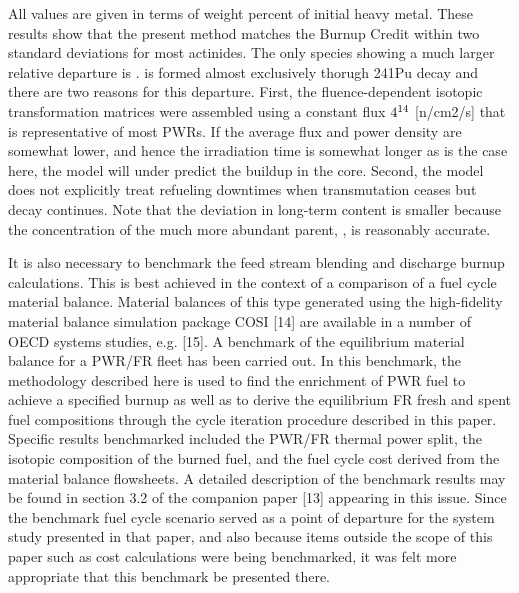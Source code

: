 All values are given in terms of weight percent of initial heavy metal.    These results show that 
the present method matches the Burnup Credit within two standard deviations for most actinides.  
The only species showing a much larger relative departure is .   is formed 
almost exclusively thorugh 241Pu decay and there are two reasons for this departure.  First, the 
fluence-dependent isotopic transformation matrices were assembled using a constant flux $4\time10^{14}$ 
[n/cm2/s] that is representative of most PWRs.  If the average flux and power density are somewhat lower, 
and hence the irradiation time is somewhat longer as is the case here, the model will under predict the 
 buildup in the core.   Second, the model does not explicitly treat refueling downtimes 
when transmutation ceases but decay continues. Note that the deviation in long-term  content 
is smaller because the concentration of the much more abundant parent, , is reasonably accurate. 

It is also necessary to benchmark the feed stream blending and discharge burnup calculations.  This is best 
achieved in the context of a comparison of a fuel cycle material balance.  Material balances of this type 
generated using the high-fidelity material balance simulation package COSI [14] are available in a number 
of OECD systems studies, e.g. [15].  A benchmark of the equilibrium material balance for a PWR/FR fleet 
has been carried out.  In this benchmark, the methodology described here is used to find the enrichment 
of PWR fuel to achieve a specified burnup as well as to derive the equilibrium FR fresh and spent fuel 
compositions through the cycle iteration procedure described in this paper.  Specific results benchmarked 
included the PWR/FR thermal power split, the isotopic composition of the burned fuel, and the fuel cycle 
cost derived from the material balance flowsheets.  A detailed description of the benchmark results may be 
found in section 3.2 of the companion paper [13] appearing in this issue.  Since the benchmark fuel cycle 
scenario served as a point of departure for the system study presented in that paper, and also because 
items outside the scope of this paper such as cost calculations were being benchmarked, it was felt 
more appropriate that this benchmark be presented there.





